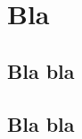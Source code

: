 

        
        \section*{Bla}
        
            \subsection*{Bla bla}
                
                \lipsum
                
            
            \subsection*{Bla bla}
                
                \lipsum
            
            
        
    

